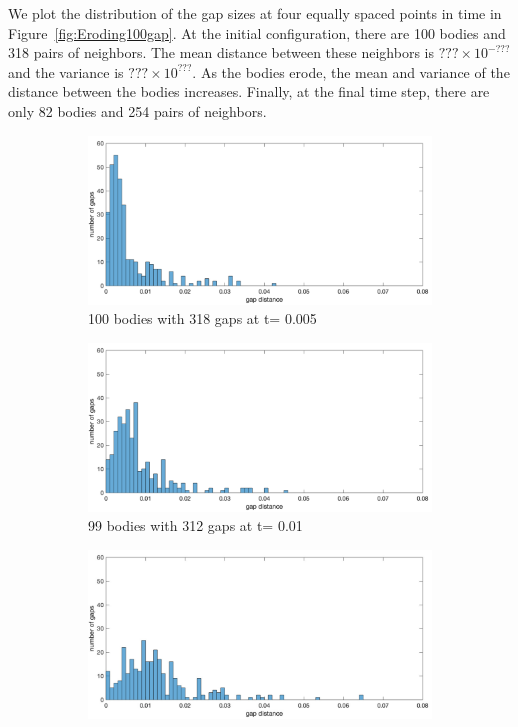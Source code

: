 \documentclass[preprint, 10pt]{elsarticle}
\begin{document}
We plot the distribution of the gap sizes at four equally spaced points
in time in Figure~\ref{fig:Eroding100gap}.  At the initial configuration, there
are 100 bodies and 318 pairs of neighbors.  The mean distance between
these neighbors is $???  \times 10^{-???}$ and the variance is $???
\times 10^{???}$.  As the bodies erode, the mean and variance of the
distance between the bodies increases.  Finally, at the final time step,
there are only 82 bodies and 254 pairs of neighbors.
\begin{figure}[H]
\begin{subfigure}[b]{0.5\textwidth}
\includegraphics*[width =\linewidth]{./figs/gap_hist100_50}
\caption{100 bodies with 318 gaps at t= 0.005}
\end{subfigure}%
\begin{subfigure}[b]{0.5\textwidth}
\includegraphics*[width =\linewidth]{./figs/gap_hist100_100}
\caption{99 bodies with 312 gaps at t= 0.01}
\end{subfigure}
\begin{subfigure}[b]{0.5\textwidth}
\includegraphics*[width =\linewidth]{./figs/gap_hist100_150}

\end{subfigure}
\end{figure}
\end{document}
